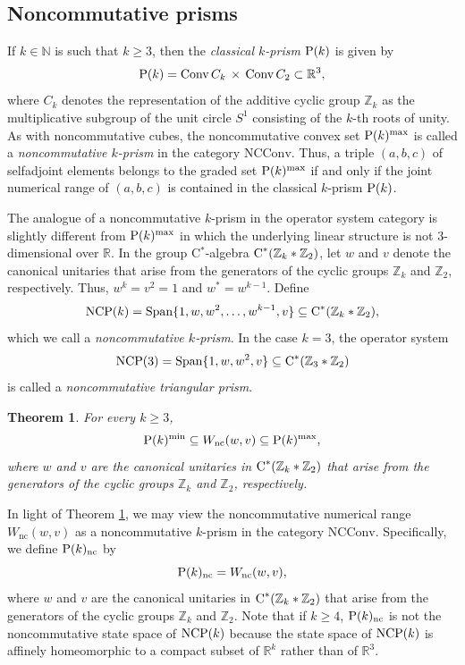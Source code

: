 \documentclass{amsart}
\newtheorem{theorem}{Theorem}[section]
\theoremstyle{definition}
\theoremstyle{remark}
\newcommand\cstar{{\textrm C}^*}                              %
\numberwithin{equation}{section}
\begin{document}
\subsection{Noncommutative prisms}  

If $k\in\mathbb N$ is such that $k\geq3$, then the \emph{classical $k$-prism}  $\mbox{\textrm P}(k)$ is given by 
\[
\mbox{\textrm P}(k)= \mbox{\textrm Conv}\,C_k \,\times\, \mbox{\textrm Conv}\,C_2 \subset \mathbb R^3,
\]
where $C_k$ denotes the representation of the additive cyclic group $\mathbb Z_k$ as the multiplicative subgroup of the unit circle $S^1$ 
consisting of the $k$-th roots of unity. As with noncommutative cubes, the noncommutative convex set $\mbox{\textrm P}(k)^{\textrm{max}}$ is called
a \emph{noncommutative $k$-prism} in the category ${\textrm{NCConv}}$. Thus, a triple $(a,b,c)$ of selfadjoint elements belongs to 
the graded set $\mbox{\textrm P}(k)^{\textrm{max}}$ if and only if the joint numerical range of $(a,b,c)$ is contained in the classical $k$-prism
$\mbox{\textrm P}(k)$.

The analogue of a noncommutative $k$-prism in the operator system category
is slightly different from $\mbox{\textrm P}(k)^{\textrm{max}}$ in which the underlying linear structure is not $3$-dimensional over $\mathbb R$.
In the group C$^*$-algebra $\cstar(\mathbb Z_k*\mathbb Z_2)$, let $w$ and $v$ denote the canonical unitaries that arise from the generators 
of the cyclic groups $\mathbb Z_k$ and $\mathbb Z_2$, respectively. Thus, $w^k=v^2=1$ and $w^*=w^{k-1}$. Define
\[
\mbox{\textrm{NCP}}(k)=\mbox{\textrm Span}\{1,w,w^2,\dots,w^{k-1},v\}\subseteq\cstar(\mathbb Z_k*\mathbb Z_2),
\]
which we call a \emph{noncommutative $k$-prism}. In the case $k=3$, the operator system 
\[
\mbox{\textrm{NCP}}(3)=\mbox{\textrm Span}\{1,w,w^2,v\}\subseteq\cstar(\mathbb Z_3*\mathbb Z_2)
\]
is called a \emph{noncommutative triangular prism}.


\begin{theorem}\label{ncp relations}
For every $k\geq 3$, 
\[
\mbox{\textrm P}(k)^{\textrm{min}} \subseteq W_{\textrm{nc}}(w,v) \subseteq \mbox{\textrm P}(k)^{\textrm{max}},
\]
where $w$ and $v$ are the canonical unitaries in $\cstar(\mathbb Z_k * \mathbb Z_2)$ that arise from the generators 
of the cyclic groups $\mathbb Z_k$ and $\mathbb Z_2$, respectively. 
\end{theorem}

In light of Theorem \ref{ncp relations}, we may view the noncommutative numerical  range $W_{\textrm{nc}}(w,v)$ as a noncommutative $k$-prism in the category 
${\textrm{NCConv}}$. Specifically, we define $\mbox{\textrm P}(k)_{\textrm{nc}}$ by
\begin{equation}\label{e:nck}
\mbox{\textrm P}(k)_{\textrm{nc}} = W_{\textrm{nc}}(w,v),
\end{equation}
where $w$ and $v$ are the canonical unitaries in $\cstar(\mathbb Z_k * \mathbb Z_2)$ that arise from the generators 
of the cyclic groups $\mathbb Z_k$ and $\mathbb Z_2$. Note that if $k\geq 4$, $\mbox{\textrm P}(k)_{\textrm{nc}}$ is not the noncommutative state space
of $\mbox{\textrm{NCP}}(k)$ because the state space of $\mbox{\textrm{NCP}}(k)$ is affinely homeomorphic to a compact subset of $\mathbb R^k$
rather than of $\mathbb R^3$.
\end{document}
